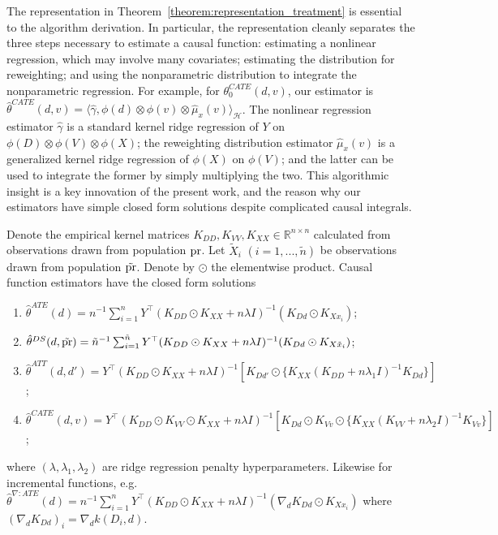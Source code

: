 The representation in Theorem~\ref{theorem:representation_treatment}  is essential to the algorithm derivation. In particular, the representation cleanly separates the three steps necessary to estimate a causal function: estimating a nonlinear regression, which may involve many covariates; estimating the distribution for reweighting; and using the nonparametric distribution to integrate the nonparametric regression. For example, for $\theta_0^{CATE}(d,v)$, our estimator is $\hat{\theta}^{CATE}(d,v)=\langle \hat{\gamma}, \phi(d)\otimes \phi(v)\otimes \hat{\mu}_x(v)\rangle_{\mathcal{H}}$. The nonlinear regression estimator $\hat{\gamma}$ is a standard kernel ridge regression of $Y$ on $\phi(D)\otimes \phi(V)\otimes \phi(X)$; the reweighting distribution estimator $\hat{\mu}_x(v)$ is a generalized kernel ridge regression of $\phi(X)$ on $\phi(V)$; and the latter can be used to integrate the former by simply multiplying the two. This algorithmic insight is a key innovation of the present work, and the reason why our estimators have simple closed form solutions despite complicated causal integrals.
\begin{algorithm}\label{algorithm:treatment}
Denote the empirical kernel matrices
$
K_{DD}, K_{VV}, K_{XX}\in\mathbb{R}^{n\times n}
$ calculated from observations drawn from population $\text{\normalfont pr}$. Let $\tilde{X}_i$ $(i=1,...,\tilde{n})$ be observations drawn from population $\tilde{\text{\normalfont pr}}$. Denote by $\odot$ the elementwise product. Causal function estimators have the closed form solutions
\begin{enumerate}
    \item $\hat{\theta}^{ATE}(d)=n^{-1}\sum_{i=1}^n Y^{\top}(K_{DD}\odot K_{XX}+n\lambda  I )^{-1}(K_{Dd}\odot K_{Xx_i})  $;
     \item $\hat{\theta}^{DS}(d,\tilde{\text{\normalfont pr}})=\tilde{n}^{-1}\sum_{i=1}^{\tilde{n}} Y^{\top}(K_{DD}\odot K_{XX}+n\lambda  I )^{-1}(K_{Dd}\odot K_{X\tilde{x}_i}) $;
    \item $\hat{\theta}^{ATT}(d,d')=Y^{\top}(K_{DD}\odot K_{XX}+n\lambda  I )^{-1}[K_{Dd'}\odot \{K_{XX}(K_{DD}+n\lambda_1  I )^{-1}K_{Dd}\}]$;
    \item $\hat{\theta}^{CATE}(d,v)=Y^{\top}(K_{DD}\odot K_{VV}\odot K_{XX} +n\lambda  I )^{-1}[K_{Dd}\odot K_{Vv}\odot \{K_{XX}(K_{VV}+n\lambda_2  I )^{-1}K_{Vv} \}] $;
\end{enumerate}
where $(\lambda,\lambda_1,\lambda_2)$ are ridge regression penalty hyperparameters.  Likewise for incremental functions, e.g. $\hat{\theta}^{\nabla:ATE}(d)=n^{-1}\sum_{i=1}^n Y^{\top}(K_{DD}\odot K_{XX}+n\lambda  I )^{-1}(\nabla_d K_{D{d}}\odot K_{Xx_i})  $ where $(\nabla_d  K_{D{d}})_i=\nabla_d k(D_i,d)$.
\end{algorithm}

